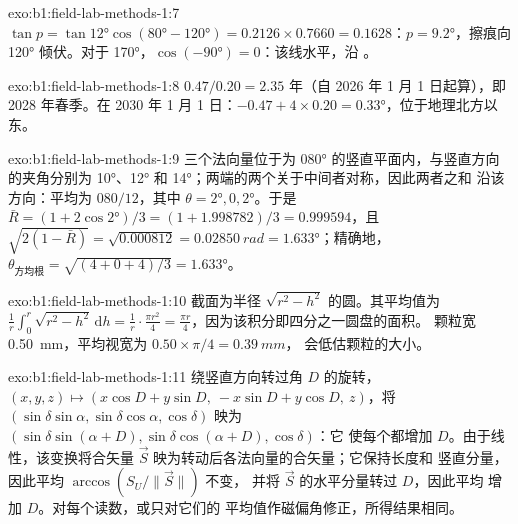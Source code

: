 \begin{solution}{exo:b1:field-lab-methods-1:7}
$\tan p = \tan\ang{12}\cos(\ang{80} - \ang{120}) = 0.2126\times0.7660 =
0.1628$：$p = \ang{9.2}$，擦痕向 \ang{120} 倾伏。对于
 \ang{170}，$\cos(\ang{-90}) = 0$：该线水平，沿
。
\end{solution}

\begin{solution}{exo:b1:field-lab-methods-1:8}
$0.47/0.20 = 2.35$ 年（自 2026 年 1 月 1 日起算），即 2028 年春季。在
2030 年 1 月 1 日：$-0.47 + 4\times0.20 = \ang{+0.33}$，位于地理北方以东。
\end{solution}

\begin{solution}{exo:b1:field-lab-methods-1:9}
三个法向量位于为 \ang{080} 的竖直平面内，与竖直方向的夹角分别为
\ang{10}、\ang{12} 和 \ang{14}；两端的两个关于中间者对称，因此两者之和
沿该方向：平均为
$080/12$，其中 $\theta = \ang{2}, 0, \ang{2}$。于是 $\bar R = (1 +
2\cos\ang{2})/3 = (1 + 1.998782)/3 = 0.999594$，且 $\sqrt{2(1 - \bar R)} =
\sqrt{0.000812} = \qty{0.02850}{rad} = \ang{1.633}$；精确地，
$\theta_{\text{方均根}} = \sqrt{(4 + 0 + 4)/3} = \ang{1.633}$。
\end{solution}

\begin{solution}{exo:b1:field-lab-methods-1:10}
截面为半径 $\sqrt{r^2 - h^2}$ 的圆。其平均值为
$\frac1r\int_0^r\sqrt{r^2 - h^2}\,\mathrm dh = \frac1r\cdot\frac{\pi r^2}{4}
= \frac{\pi r}{4}$，因为该积分即四分之一圆盘的面积。
颗粒宽 \qty{0.50}{mm}，平均视宽为 $0.50\times\pi/4 = \qty{0.39}{mm}$，
会低估颗粒的大小。
\end{solution}

\begin{solution}{exo:b1:field-lab-methods-1:11}
绕竖直方向转过角 $D$ 的旋转，
$(x, y, z) \mapsto (x\cos D + y\sin D,\ -x\sin D + y\cos D,\ z)$，将
$(\sin\delta\sin\alpha, \sin\delta\cos\alpha, \cos\delta)$ 映为
$(\sin\delta\sin(\alpha + D), \sin\delta\cos(\alpha + D), \cos\delta)$：它
使每个都增加 $D$。由于线性，该变换将合矢量
$\vec S$ 映为转动后各法向量的合矢量；它保持长度和
竖直分量，因此平均 $\arccos(S_U/\|\vec S\|)$ 不变，
并将 $\vec S$ 的水平分量转过 $D$，因此平均
增加 $D$。对每个读数，或只对它们的
平均值作磁偏角修正，所得结果相同。
\end{solution}

